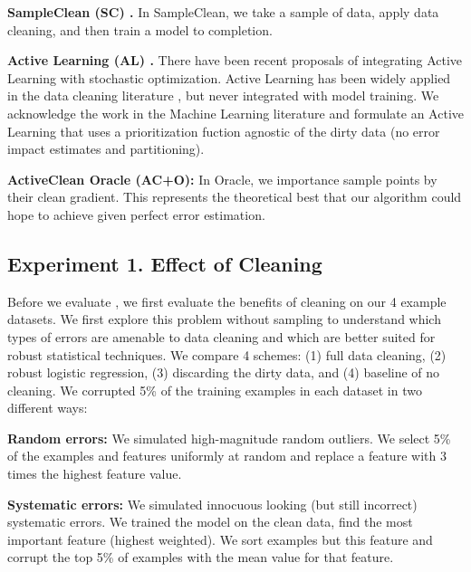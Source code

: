 \vspace{0.5em}

\noindent\textbf{SampleClean (SC) \cite{wang1999sample}. } In SampleClean, we take a sample of data, apply data cleaning, and then train a model to completion.

\vspace{0.5em}

\noindent\textbf{Active Learning (AL) \cite{guillory2009active}. } There have been recent proposals of integrating Active Learning with stochastic optimization. Active Learning has been widely applied in the data cleaning literature \cite{gokhale2014corleone}, but never integrated with model training. We acknowledge the work in the Machine Learning literature and formulate an Active Learning that uses a prioritization fuction agnostic of the dirty data (no error impact estimates and partitioning). 

\vspace{0.5em}

\noindent\textbf{ActiveClean Oracle (AC+O): } In \sys Oracle, we importance sample points by their clean gradient. This represents the theoretical best that our algorithm could hope to achieve given perfect error estimation.

\subsection{Experiment 1. Effect of Cleaning}
Before we evaluate \sys, we first evaluate the benefits of cleaning on our 4 example datasets.
We first explore this problem without sampling to understand which types of errors are amenable to data cleaning and which are better suited for robust statistical techniques.
We compare 4 schemes: (1) full data cleaning, (2) robust logistic regression, (3) discarding the dirty data, and (4) baseline of no cleaning. We corrupted 5\% of the training examples in each dataset in two different ways:

\vspace{0.5em}

\noindent\textbf{Random errors: } We simulated high-magnitude random outliers. We select 5\% of the examples and features uniformly at random and replace a feature with 3 times the highest feature value.

\vspace{0.5em}

\noindent\textbf{Systematic errors: } We simulated innocuous looking (but still incorrect) systematic errors. We trained the model on the clean data, find the most important feature (highest weighted). We sort examples but this feature and corrupt the top 5\% of examples with the mean value for that feature.

